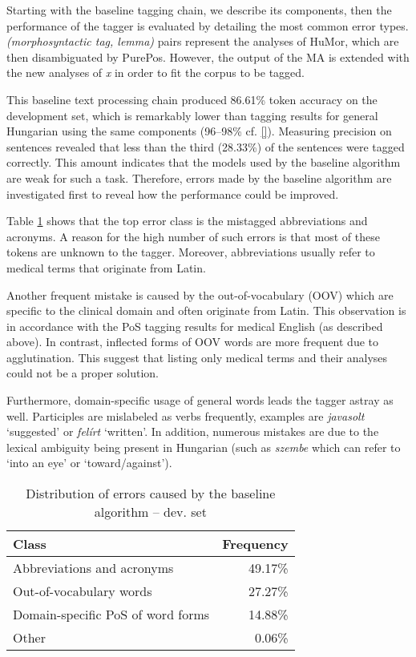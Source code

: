 \label{sec:baseline}

Starting with the baseline tagging chain, we describe its components, then the performance of the tagger is evaluated by detailing the most common error types. \emph{(morphosyntactic tag, lemma)} pairs represent the analyses of HuMor, which are then disambiguated by PurePos. However, the output of the MA is extended with the new analyses of \textit{x} in order to fit the corpus to be tagged. 

This baseline text processing chain produced 86.61\% token accuracy on the development set, which is remarkably lower than tagging results for general Hungarian using the same components (96--98\% cf. \ref{}). Measuring precision on sentences revealed that less than the third (28.33\%) of the sentences were tagged correctly. This amount indicates that the models used by the baseline algorithm are weak for such a task. Therefore, errors made by the baseline algorithm are investigated first to reveal how the performance could be improved. 

Table \ref{tab:error_types} shows that the top error class is the mistagged abbreviations and acronyms. 
A reason for the high number of such errors is that most of these tokens are unknown to the tagger. Moreover, abbreviations usually refer to medical terms that originate from Latin.

Another frequent mistake is caused by the out-of-vocabulary (OOV) which are specific to the clinical domain and often originate from Latin.
This observation is in accordance with the PoS tagging results for medical English (as described above). 
In contrast, inflected forms of OOV words are more frequent due to agglutination. This suggest that listing only medical terms and their analyses could not be a proper solution. 

Furthermore, domain-specific usage of general words leads the tagger astray as well. Participles are mislabeled as verbs frequently, examples are \textit{javasolt} `suggested’ or  \textit{felírt} `written’. 
In addition, numerous mistakes are due to the lexical ambiguity being present in Hungarian 
(such as \textit{szembe} which can refer to `into an eye’ or `toward/against’). 

\begin{table}
\centering
\caption{Distribution of errors caused by the baseline algorithm -- dev. set}
\label{tab:error_types}
\begin{tabular}{ l r } 
\hline
Class & Frequency  \\
\hline
Abbreviations and acronyms & 49.17\% \\
Out-of-vocabulary words & 27.27\% \\
Domain-specific PoS of word forms & 14.88\% \\
Other & 0.06\% \\
\hline
\end{tabular}
\end{table}


